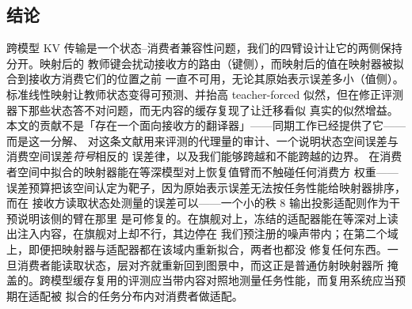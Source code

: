 \documentclass[11pt]{article}
\begin{document}
\subsection{结论}
\label{sec:conclusion}
跨模型 KV 传输是一个状态--消费者兼容性问题，我们的四臂设计让它的两侧保持分开。映射后的
教师键会扰动接收方的路由（键侧），而映射后的值在映射器被拟合到接收方消费它们的位置之前
一直不可用，无论其原始表示误差多小（值侧）。标准线性映射让教师状态变得可预测、并抬高
teacher-forced 似然，但在修正评测器下那些状态答不对问题，而无内容的缓存复现了让迁移看似
真实的似然增益。
本文的贡献不是「存在一个面向接收方的翻译器」——同期工作已经提供了它——而是这一分解、
对这条文献用来评测的代理量的审计、一个说明状态空间误差与消费空间误差\emph{符号}相反的
误差律，以及我们能够跨越和不能跨越的边界。
在消费者空间中拟合的映射器能在等深模型对上恢复值臂而不触碰任何消费方
权重——误差预算把该空间认定为靶子，因为原始表示误差无法按任务性能给映射器排序，而在
接收方读取状态处测量的误差可以——一个小的秩 8 输出投影适配则作为干预说明该侧的臂在那里
是可修复的。在旗舰对上，冻结的适配器能在等深对上读出注入内容，在旗舰对上却不行，其边停在
我们预注册的噪声带内；在第二个域上，即便把映射器与适配器都在该域内重新拟合，两者也都没
修复任何东西。一旦消费者能读取状态，层对齐就重新回到图景中，而这正是普通仿射映射器所
掩盖的。跨模型缓存复用的评测应当带内容对照地测量任务性能，而复用系统应当预期在适配被
拟合的任务分布内对消费者做适配。

\end{document}

